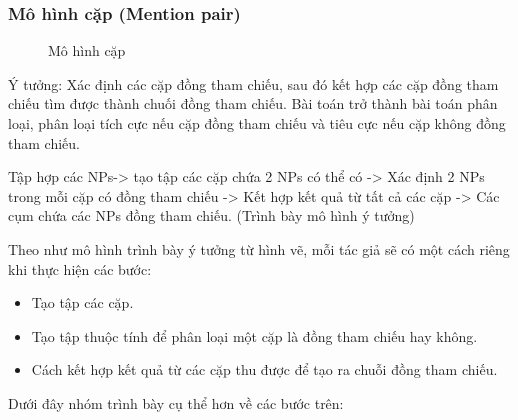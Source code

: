 \documentclass[12pt]{extarticle}
\begin{document}
			\subsubsection*{Mô hình cặp (Mention pair)}
				\begin{figure}[H]
					\centering
					
					\caption{Mô hình cặp}
				\end{figure}
				\par Ý tưởng:  Xác định các cặp đồng tham chiếu, sau đó kết hợp các cặp đồng tham chiếu tìm được thành chuối đồng tham chiếu. Bài toán trở thành bài toán phân loại, phân loại tích cực nếu cặp đồng tham chiếu và tiêu cực nếu cặp không đồng tham chiếu.
				\par Tập hợp các NPs-> tạo tập các cặp chứa 2 NPs có thể có -> Xác định 2 NPs trong mỗi cặp có đồng tham chiếu -> Kết hợp kết quả từ tất cả các cặp -> Các cụm chứa các NPs đồng tham chiếu. (Trình bày mô hình ý tưởng)
				\par Theo như mô hình trình bày ý tưởng từ hình vẽ, mỗi tác giả sẽ có một cách riêng khi thực hiện các bước:
				\begin{itemize}
					\item{Tạo tập các cặp.}
					\item{Tạo tập thuộc  tính để phân loại một cặp là đồng tham chiếu hay không.}
					\item{Cách kết hợp kết quả từ các cặp thu được để tạo ra chuỗi đồng tham chiếu.}
				\end{itemize}
				\par Dưới đây nhóm trình bày cụ thể hơn về các bước trên:
\end{document}
